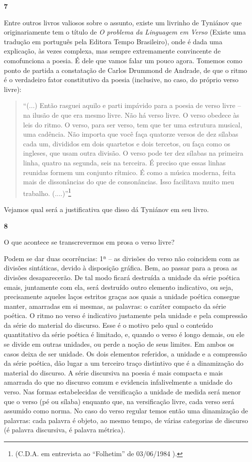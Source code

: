 \textbf{7 }

Entre outros livros valiosos sobre o assunto, existe um livrinho de
Tyniánov que originariamente tem o título de \emph{O problema da
Linguagem em Verso} (Existe uma tradução em português pela Editora Tempo
Brasileiro), onde é dada uma explicação, às vezes complexa, mas sempre
extremamente convincente de comofunciona a poesia. É dele que vamos
falar um pouco agora. Tomemos como ponto de partida a constatação de
Carlos Drummond de Andrade, de que o ritmo é o verdadeiro fator
constitutivo da poesia (inclusive, no caso, do próprio verso livre):

\begin{quote}
``(...) Então rasguei aquilo e parti impávido para a poesia de verso
livre -- na ilusão de que era mesmo livre. Não há verso livre. O verso
obedece às leis do ritmo. O verso, para ser verso, tem que ter uma
estrutura musical, uma cadência. Não importa que você faça quatorze
versos de dez sílabas cada um, divididos em dois quartetos e dois
tercetos, ou faça como os ingleses, que usam outra divisão. O verso pode
ter dez sílabas na primeira linha, quatro na segunda, seis na terceira.
É preciso que essas linhas reunidas formem um conjunto rítmico. É como a
música moderna, feita mais de dissonâncias do que de consonâncias. Isso
facilitava muito meu trabalho. (....)''\footnote{(C.D.A. em entrevista
  ao ``Folhetim'' de 03/06/1984 ).}
\end{quote}

Vejamos qual será a justificativa que disso dá Tyniánov em seu livro.

\textbf{8}

O que acontece se transcrevermos em prosa o verso livre?

Podem se dar duas ocorrências: 1ª -- as divisões do verso não coincidem
com as divisões sintáticas, devido à disposição gráfica. Bem, ao passar
para a prosa as divisões desaparecerão. De tal modo ficará destruída a
unidade da série poética emais, juntamente com ela, será destruído outro
elemento indicativo, ou seja, precisamente aqueles laços estritos graças
aos quais a unidade poética consegue manter, amarradas em si mesmas, as
palavras: o caráter compacto da série poética. O ritmo no verso é
indicativo justamente pela unidade e pela compressão da série do
material do discurso. Esse é o motivo pelo qual o conteúdo quantitativo
da série poética é limitado, e, quando o verso é longo demais, ou ele se
divide em outras unidades, ou perde a noção de seus limites. Em ambos os
casos deixa de ser unidade. Os dois elementos referidos, a unidade e a
compressão da série poética, dão lugar a um terceiro traço distintivo
que é a dinamização do material do discurso. A série discursiva na
poesia é mais compacta e mais amarrada do que no discurso comum e
evidencia infalivelmente a unidade do verso. Nas formas estabelecidas de
versificação a unidade de medida será menor que o verso (pé ou sílaba)
enquanto que, na versificação livre, cada verso será assumido como
norma. No caso do verso regular temos então uma dinamização de palavras:
cada palavra é objeto, ao mesmo tempo, de várias categorias de discurso
(é palavra discursiva, é palavra métrica).

